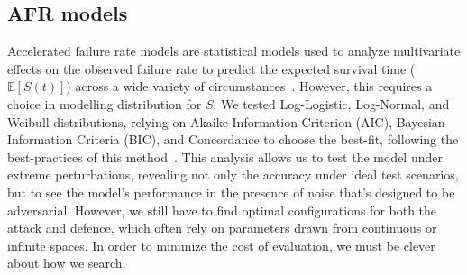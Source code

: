 \documentclass[conference]{IEEEtran}
\begin{document}
\subsection{AFR models}
\label{afr}
Accelerated failure rate models are statistical models used to analyze multivariate effects on the observed failure rate to predict the expected survival time ($\mathbb{E}[S(t)]$) across a wide variety of circumstances~\cite{aft_models,kleinbaum1996survival}. However, this requires a choice in modelling distribution for $S$. We tested Log-Logistic, Log-Normal, and Weibull distributions, relying on Akaike Information Criterion (AIC), Bayesian Information Criteria (BIC), and Concordance to choose the best-fit, following the best-practices of this method~\cite{aft_models,kleinbaum1996survival}.  This analysis allows us to test the model under extreme perturbations, revealing not only the accuracy under ideal test scenarios, but to see the model's performance in the presence of noise that's designed to be adversarial. However, we still have to find optimal configurations for both the attack and defence, which often rely on parameters drawn from continuous or infinite spaces. In order to minimize the cost of evaluation, we must be clever about how we search.


\end{document}
